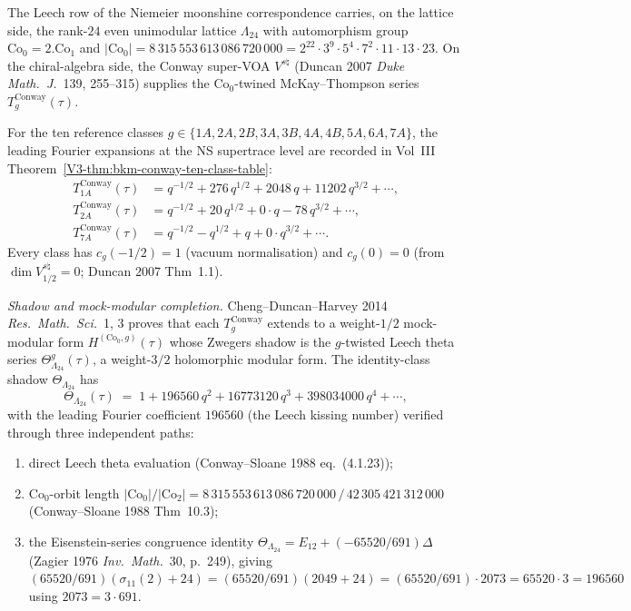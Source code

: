 \begin{remark}
\label{rem:latfnd-conway-fourier}
%
%
The Leech row of the Niemeier moonshine correspondence carries, on
the lattice side, the rank-$24$ even unimodular lattice
$\Lambda_{24}$ with automorphism group
$\mathrm{Co}_0 = 2.\mathrm{Co}_1$ and
$|\mathrm{Co}_0| = 8\,315\,553\,613\,086\,720\,000
= 2^{22} \cdot 3^9 \cdot 5^4 \cdot 7^2 \cdot 11 \cdot 13 \cdot 23$.
On the chiral-algebra side, the Conway super-VOA $V^{s\natural}$
(Duncan 2007 \emph{Duke Math.~J.}~139, 255--315) supplies the
$\mathrm{Co}_0$-twined McKay--Thompson series
$T_g^{\mathrm{Conway}}(\tau)$.

For the ten reference classes
$g \in \{1A, 2A, 2B, 3A, 3B, 4A, 4B, 5A, 6A, 7A\}$, the leading Fourier
expansions at the NS supertrace level are recorded in Vol~III
Theorem~\ref{V3-thm:bkm-conway-ten-class-table}:
\begin{align*}
T_{1A}^{\mathrm{Conway}}(\tau)
 &= q^{-1/2} + 276\, q^{1/2} + 2048\, q + 11202\, q^{3/2} + \cdots, \\
T_{2A}^{\mathrm{Conway}}(\tau)
 &= q^{-1/2} + 20\, q^{1/2} + 0 \cdot q - 78\, q^{3/2} + \cdots, \\
T_{7A}^{\mathrm{Conway}}(\tau)
 &= q^{-1/2} - q^{1/2} + q + 0 \cdot q^{3/2} + \cdots.
\end{align*}
Every class has $c_g(-1/2) = 1$ (vacuum normalisation) and
$c_g(0) = 0$ (from $\dim V^{s\natural}_{1/2} = 0$; Duncan 2007 Thm~1.1).

\emph{Shadow and mock-modular completion.}
Cheng--Duncan--Harvey 2014 \emph{Res.\ Math.\ Sci.}~1, 3 proves that
each $T_g^{\mathrm{Conway}}$ extends to a weight-$1/2$ mock-modular form
$H^{(\mathrm{Co}_0, g)}(\tau)$ whose Zwegers shadow is the $g$-twisted
Leech theta series $\Theta^g_{\Lambda_{24}}(\tau)$, a weight-$3/2$
holomorphic modular form. The identity-class shadow
$\Theta_{\Lambda_{24}}$ has
\[
 \Theta_{\Lambda_{24}}(\tau)
 \;=\;
 1 + 196560\, q^2 + 16773120\, q^3 + 398034000\, q^4 + \cdots,
\]
with the leading Fourier coefficient $196560$ (the Leech kissing number)
verified through three independent paths:
\begin{enumerate}[label=\textup{(\roman*)}]
\item direct Leech theta evaluation (Conway--Sloane 1988 eq.~(4.1.23));
\item $\mathrm{Co}_0$-orbit length
$|\mathrm{Co}_0|/|\mathrm{Co}_2| = 8\,315\,553\,613\,086\,720\,000 \,/\,
42\,305\,421\,312\,000$ (Conway--Sloane 1988 Thm~10.3);
\item the Eisenstein-series congruence identity
$\Theta_{\Lambda_{24}} = E_{12} + (-65520/691)\Delta$ (Zagier 1976
\emph{Inv.\ Math.}~30, p.~249), giving
$(65520/691)(\sigma_{11}(2) + 24) = (65520/691)(2049 + 24)
= (65520/691)\cdot 2073 = 65520 \cdot 3 = 196560$ using
$2073 = 3 \cdot 691$.
\end{enumerate}


\end{remark}
